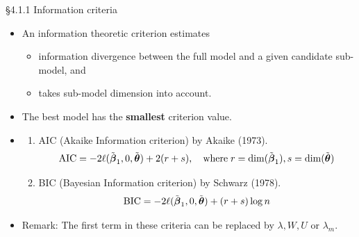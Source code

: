 \documentclass{beamer}
\begin{document}
\begin{frame}{\S4.1.1 Information criteria}
\begin{itemize}
\item


An
information theoretic criterion estimates
\begin{itemize}
\item information divergence between the full model 
and a given candidate sub-model, and
\item takes sub-model dimension into account. 
\end{itemize}
\item
The best model has the \textbf{smallest} criterion value.
\item

\begin{enumerate}
\item
AIC (Akaike Information criterion) by Akaike (1973). 
$$\mbox{AIC}=-2\ell(\tilde{\mbox{\boldmath $\beta$}}_1, 0, 
\tilde{\mbox{\boldmath $\theta$}})+2(r+s), \quad \mbox{where}\; 
r=\dim( \tilde{\mbox{\boldmath $\beta$}}_1), s=\dim(\tilde{\mbox{\boldmath $\theta$}})$$
\item
BIC (Bayesian Information criterion)  by Schwarz (1978).  
$$\mbox{BIC}=-2\ell(\tilde{\mbox{\boldmath $\beta$}}_1, 0, 
\tilde{\mbox{\boldmath $\theta$}})+(r+s)\log n$$



\end{enumerate}
\item
Remark: The first term in these criteria can be replaced by $\lambda, W, U$ or $\lambda_m$.
\end{itemize}
\end{frame}
\end{document}
